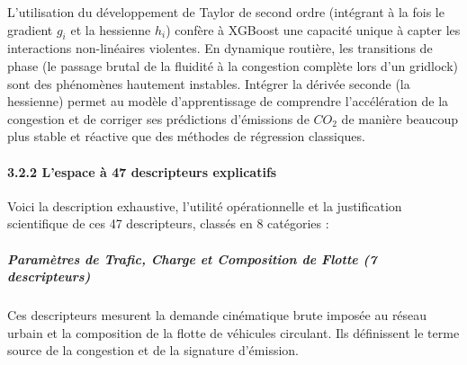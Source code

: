 \documentclass[10pt, a4paper]{article}
\begin{document}
L'utilisation du développement de Taylor de second ordre (intégrant à la
fois le gradient \(g_i\) et la hessienne \(h_i\)) confère à XGBoost une
capacité unique à capter les interactions non-linéaires violentes. En
dynamique routière, les transitions de phase (le passage brutal de la
fluidité à la congestion complète lors d'un gridlock) sont des
phénomènes hautement instables. Intégrer la dérivée seconde (la
hessienne) permet au modèle d'apprentissage de comprendre l'accélération
de la congestion et de corriger ses prédictions d'émissions de \(CO_2\)
de manière beaucoup plus stable et réactive que des méthodes de
régression classiques.

\paragraph{3.2.2 L'espace à 47 descripteurs
explicatifs}\label{lespace-uxe0-47-descripteurs-explicatifs}

Voici la description exhaustive, l'utilité opérationnelle et la
justification scientifique de ces 47 descripteurs, classés en 8
catégories :

\subparagraph{Paramètres de Trafic, Charge et Composition de Flotte (7
descripteurs)}\label{paramuxe8tres-de-trafic-charge-et-composition-de-flotte-7-descripteurs}

Ces descripteurs mesurent la demande cinématique brute imposée au réseau
urbain et la composition de la flotte de véhicules circulant. Ils
définissent le terme source de la congestion et de la signature
d'émission.
\end{document}
